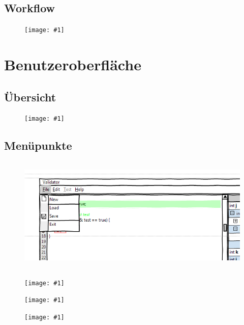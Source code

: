 \documentclass[a4paper,10pt]{article}
\newlength{\imgwidth}
\newcommand\scalegraphics[1]{
  \settowidth{\imgwidth}{\texttt{[image: \#1]}}
  \setlength{\imgwidth}{\minof{\imgwidth}{\textwidth}}
  \texttt{[image: \#1]}
}
\begin{document}
\newpage
\subsection{Workflow}
\begin{figure}[h!]
\begin{center}
\scalegraphics{images/process.png}
\end{center}
\end{figure}


\section{Benutzeroberfl\"{a}che}
\subsection{\"{U}bersicht}
\begin{figure}[h!]
\scalegraphics{images/mockupf.png}
\end{figure}

\subsection{Men\"{u}punkte}
\begin{figure}[h!]
\begin{center}
\includegraphics[height=5.5cm]{images/menu1.png}
\end{center}
\end{figure}
\begin{figure}[h!]
\scalegraphics{images/menu2.png}
\end{figure}
\begin{figure}[h!]
\scalegraphics{images/menu3.png}
\end{figure}
\begin{figure}[h!]
\scalegraphics{images/menu4.png}
\end{figure}

\clearpage
\end{document}

